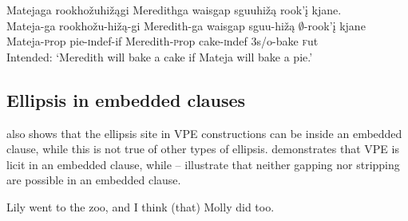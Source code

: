 \documentclass[output=paper]{LSP/langsci}
\begin{document}
 
\ea\label{ex:johnson:36}
\ea\label{ex:johnson:36a} 
\glll Matejaga rookhožuhižągi Meredithga {waisgap sguuhižą} rook'į kjane.\\
Mateja-ga rookhožu-hižą-gi Meredith-ga {waisgap sguu-hižą} $\emptyset$-rook'į kjane\\
Mateja-{\textsc prop} pie-{\textsc indef}-if Meredith-{\textsc prop} cake-{\textsc indef} {\textsc 3s/o}-bake {\textsc fut}\\
\trans Intended: `Meredith will bake a cake if Mateja will bake a pie.'	
\label{ex:johnson:36b}
\label{ex:johnson:36c}
\z
\z

\subsection{Ellipsis in embedded clauses}\label{sec:johnson:3.4}

\citet{Goldberg2005} also shows that the ellipsis site in VPE constructions can be inside an embedded clause, while this is not true of other types of ellipsis.  demonstrates that VPE is licit in an embedded clause, while -- illustrate that neither gapping nor stripping are possible in an embedded clause.

 
\ea\label{ex:johnson:37}
\ea\label{ex:johnson:37a} 
Lily went to the zoo, and I think (that) Molly did too.
\label{ex:johnson:37b}
\label{ex:johnson:3c}
\z
\z
\end{document}
